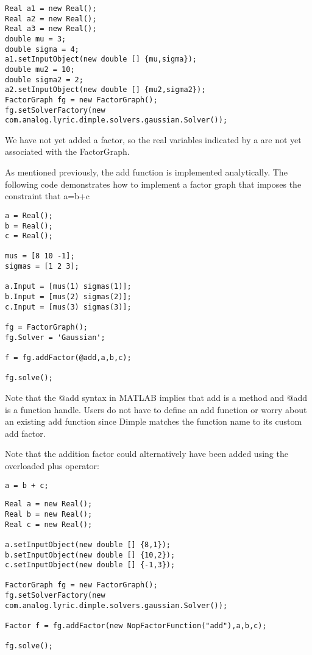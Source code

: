 \ifjava
\begin{lstlisting}
Real a1 = new Real();
Real a2 = new Real();
Real a3 = new Real();
double mu = 3;
double sigma = 4;
a1.setInputObject(new double [] {mu,sigma});
double mu2 = 10;
double sigma2 = 2;
a2.setInputObject(new double [] {mu2,sigma2});
FactorGraph fg = new FactorGraph(); 
fg.setSolverFactory(new com.analog.lyric.dimple.solvers.gaussian.Solver());
\end{lstlisting}
\fi

We have not yet added a factor, so the real variables indicated by a are not yet associated with the FactorGraph.


As mentioned previously, the add function is implemented analytically. The following code demonstrates how to implement a factor graph that imposes the constraint that a=b+c

\ifmatlab
\begin{lstlisting}
a = Real();
b = Real();
c = Real();
 
mus = [8 10 -1];
sigmas = [1 2 3];

a.Input = [mus(1) sigmas(1)];
b.Input = [mus(2) sigmas(2)];
c.Input = [mus(3) sigmas(3)];

fg = FactorGraph();
fg.Solver = 'Gaussian';

f = fg.addFactor(@add,a,b,c);

fg.solve();
\end{lstlisting}

Note that the @add syntax in MATLAB implies that add is a method and @add is a function handle. Users do not have to define an add function or worry about an existing add function since Dimple matches the function name to its custom add factor.

Note that the addition factor could alternatively have been added using the overloaded plus operator:

\begin{lstlisting}
a = b + c;
\end{lstlisting}


\fi

\ifjava
\begin{lstlisting}
Real a = new Real();
Real b = new Real();
Real c = new Real();
		 
a.setInputObject(new double [] {8,1});
b.setInputObject(new double [] {10,2});
c.setInputObject(new double [] {-1,3});

FactorGraph fg = new FactorGraph();
fg.setSolverFactory(new com.analog.lyric.dimple.solvers.gaussian.Solver());

Factor f = fg.addFactor(new NopFactorFunction("add"),a,b,c);

fg.solve();
\end{lstlisting}


